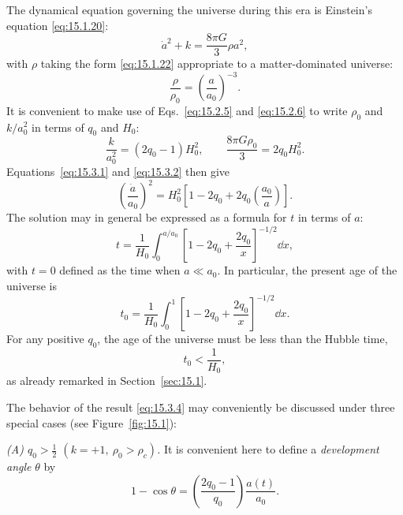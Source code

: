 The dynamical equation governing the universe during this era is Einstein's
equation \eqref{eq:15.1.20}:
\begin{equation}
  \dot a^2+k=\frac{8\pi G}{3}\rho a^2,
  \tag{15.3.1}\label{eq:15.3.1}
\end{equation}
with \(\rho\) taking the form \eqref{eq:15.1.22} appropriate to a
matter-dominated universe:
\begin{equation}
  \frac{\rho}{\rho_0}
  =
  \left(\frac{a}{a_0}\right)^{-3}.
  \tag{15.3.2}\label{eq:15.3.2}
\end{equation}
It is convenient to make use of Eqs.~\eqref{eq:15.2.5} and
\eqref{eq:15.2.6} to write \(\rho_0\) and \(k/a_0^2\) in terms of \(q_0\)
and \(H_0\):
\[
  \frac{k}{a_0^2}=(2q_0-1)H_0^2,
  \qquad
  \frac{8\pi G\rho_0}{3}=2q_0H_0^2.
\]
Equations~\eqref{eq:15.3.1} and \eqref{eq:15.3.2} then give
\begin{equation}
  \left(\frac{\dot a}{a_0}\right)^2
  =
  H_0^2
  \left[
    1-2q_0+2q_0\left(\frac{a_0}{a}\right)
  \right].
  \tag{15.3.3}\label{eq:15.3.3}
\end{equation}
The solution may in general be expressed as a formula for \(t\) in terms of
\(a\):
\begin{equation}
  t
  =
  \frac1{H_0}
  \int_0^{a/a_0}
  \left[
    1-2q_0+\frac{2q_0}{x}
  \right]^{-1/2}
  \dd x,
  \tag{15.3.4}\label{eq:15.3.4}
\end{equation}
with \(t=0\) defined as the time when \(a\ll a_0\). In particular, the
present age of the universe is
\begin{equation}
  t_0
  =
  \frac1{H_0}
  \int_0^1
  \left[
    1-2q_0+\frac{2q_0}{x}
  \right]^{-1/2}
  \dd x.
  \tag{15.3.5}\label{eq:15.3.5}
\end{equation}
For any positive \(q_0\), the age of the universe must be less than the
Hubble time,
\begin{equation}
  t_0<\frac1{H_0},
  \tag{15.3.6}\label{eq:15.3.6}
\end{equation}
as already remarked in Section~\ref{sec:15.1}.

The behavior of the result \eqref{eq:15.3.4} may conveniently be discussed
under three special cases (see Figure~\ref{fig:15.1}):

\emph{(A) \(q_0>\tfrac12\)
\((k=+1,\ \rho_0>\rho_c)\).} It is convenient here to define a
\emph{development angle} \(\theta\) by
\begin{equation}
  1-\cos\theta
  =
  \left(\frac{2q_0-1}{q_0}\right)\frac{a(t)}{a_0}.
  \tag{15.3.7}\label{eq:15.3.7}
\end{equation}

